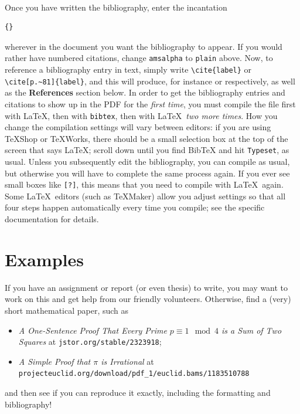 \documentclass[10pt]{article}
\begin{document}
\paragraph{}

Once you have written the bibliography, enter the incantation
\begin{verbatim}
{}

\end{verbatim}
wherever in the document you want the bibliography to appear. If you would rather have numbered citations, change \texttt{amsalpha} to \texttt{plain} above. Now, to reference a bibliography entry in text, simply write \verb$\cite{label}$ or \verb$\cite[p.~81]{label}$, and this will produce, for instance \cite{KN} or \cite[p.~81]{KN} respectively, as well as the \textbf{References} section below. In order to get the bibliography entries and citations to show up in the PDF for the \textit{first time}, you must compile the file first with \LaTeX , then with \texttt{bibtex}, then with \LaTeX\  \textit{two more times}. How you change the compilation settings  will vary between editors: if you are using TeXShop or TeXWorks, there should be a small selection box at the top of the screen that says \LaTeX; scroll down until you find BibTeX and hit \texttt{Typeset}, as usual. Unless you subsequently edit the bibliography, you can compile as usual, but otherwise you will have to complete the same process again. If you ever see small boxes like \verb$[?]$, this means that you need to compile with \LaTeX\ again. Some \LaTeX\ editors (such as TeXMaker) allow you adjust settings so that all four steps happen automatically every time you compile; see the specific documentation for details.

{}


\section{Examples}

If you have an assignment or report (or even thesis) to write, you may want to work on this and get help from our friendly volunteers. Otherwise, find a (very) short mathematical paper, such as
\begin{itemize}
\item \textit{A One-Sentence Proof That Every Prime $p \equiv 1 \mod 4$ is a Sum of Two Squares} at \verb$jstor.org/stable/2323918$;
\item  \textit{A Simple Proof that $\pi$ is Irrational} at \verb$projecteuclid.org/download/pdf_1/euclid.bams/1183510788$
\end{itemize}
and then see if you can reproduce it exactly, including the formatting and bibliography!
\end{document}
